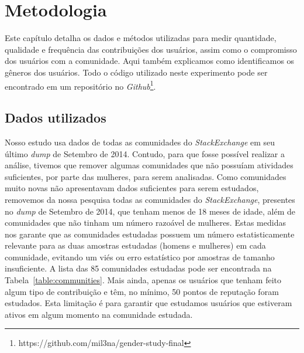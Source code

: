 \chapter{Metodologia}
\label{ch:metodos}

Este capítulo detalha os dados e métodos utilizadas para medir quantidade, qualidade e frequência das contribuições dos usuários, assim como o compromisso dos usuários com a comunidade. Aqui também explicamos como identificamos os gêneros dos usuários. Todo o código utilizado neste experimento pode ser encontrado em um repositório no \emph{Github}\footnote{https://github.com/mil3na/gender-study-final}. 

\section{Dados utilizados}

Nosso estudo usa dados de todas as comunidades do \emph{StackExchange} em seu último \emph{dump} de Setembro de 2014. Contudo, para que fosse possível realizar a análise, tivemos que remover  algumas comunidades que  não possuíam atividades suficientes, por parte das mulheres, para serem analisadas. Como comunidades muito novas não apresentavam dados suficientes para serem estudados, removemos da nossa pesquisa todas as comunidades do \emph{StackExchange}, presentes no \emph{dump} de Setembro de 2014, que tenham menos de 18 meses de idade, além de comunidades que não tinham um número razoável de mulheres. Estas medidas nos garante que as comunidades estudadas possuem um número estatisticamente relevante para as duas amostras estudadas (homens e mulheres) em cada comunidade, evitando um viés ou erro estatístico por amostras de tamanho insuficiente. A lista das 85 comunidades estudadas pode ser encontrada na Tabela~\ref{table:communities}. Mais ainda, apenas os usuários que tenham feito algum tipo de contribuição e têm, no mínimo, 50 pontos de reputação foram estudados. Esta limitação é para garantir que estudamos usuários que estiveram ativos em algum momento na comunidade estudada.

